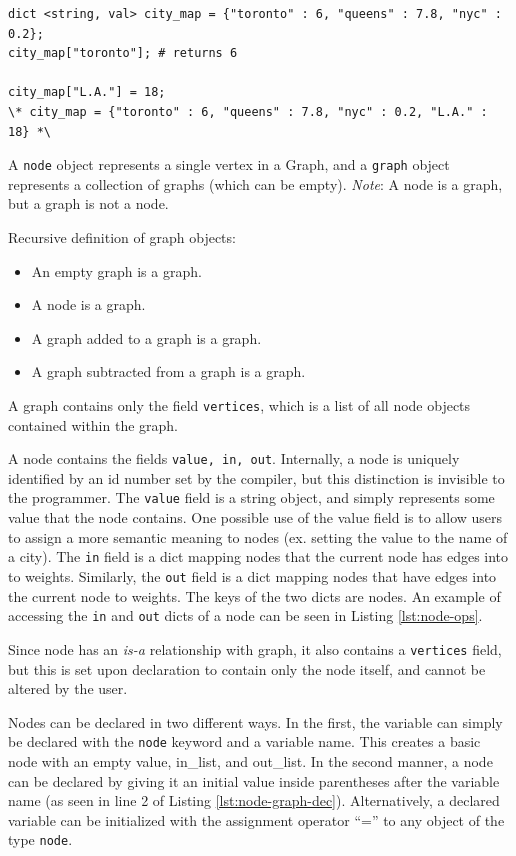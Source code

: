 \documentclass{article}
\newcommand{\code}[1]{\texttt{#1}} %
\begin{document}
\begin{lstlisting}[language=pltLang, caption=The ``dict'' type., label=lst:dict]
dict <string, val> city_map = {"toronto" : 6, "queens" : 7.8, "nyc" : 0.2};
city_map["toronto"]; # returns 6

city_map["L.A."] = 18;
\* city_map = {"toronto" : 6, "queens" : 7.8, "nyc" : 0.2, "L.A." : 18} *\

\end{lstlisting}


A \code{node} object represents a single vertex in a Graph, and a \code{graph} object represents a collection of graphs (which can be empty). \emph{Note}: A node is a graph, but a graph is not a node.

Recursive definition of graph objects:
\begin{itemize}
\item An empty graph is a graph.
\item A node is a graph.
\item A graph added to a graph is a graph.
\item A graph subtracted from a graph is a graph.
\end{itemize}

A graph contains only the field \code{vertices}, which is a list of all node objects contained within the graph. 

A node contains the fields \code{value, in, out}. Internally, a node is uniquely identified by an id number set by the compiler, but this distinction is invisible to the programmer. The \code{value} field is a string object, and simply represents some value that the node contains. One possible use of the value field is to allow users to assign a more semantic meaning to nodes (ex. setting the value to the name of a city). The \code{in} field is a dict mapping nodes that the current node has edges into to weights. Similarly, the \code{out} field is a dict mapping nodes that have edges into the current node to weights. The keys of the two dicts are nodes. An example of accessing the \code{in} and \code{out} dicts of a node can be seen in Listing \ref{lst:node-ops}.

Since node has an \emph{is-a} relationship with graph, it also contains a \code{vertices} field, but this is set upon declaration to contain only the node itself, and cannot be altered by the user.

Nodes can be declared in two different ways. In the first, the variable can simply be declared with the \code{node} keyword and a variable name. This creates a basic node with an empty value, in\_list, and out\_list. In the second manner, a node can be declared by giving it an initial value inside parentheses after the variable name (as seen in line 2 of Listing \ref{lst:node-graph-dec}). Alternatively, a declared variable can be initialized with the assignment operator ``='' to any object of the type \code{node}.
\end{document}

